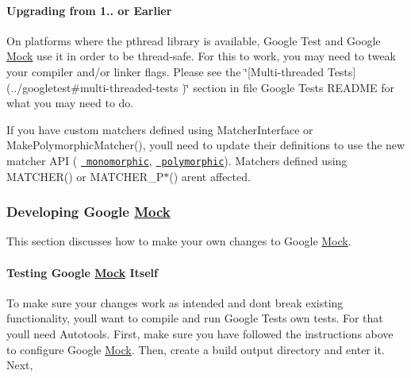 \paragraph*{Upgrading from 1.. or Earlier}

On platforms where the pthread library is available, Google Test and Google \mbox{\hyperlink{class_mock}{Mock}} use it in order to be thread-\/safe. For this to work, you may need to tweak your compiler and/or linker flags. Please see the \char`\"{}\mbox{[}\+Multi-\/threaded Tests\mbox{]}(../googletest\#multi-\/threaded-\/tests
)\char`\"{} section in file Google Test\textquotesingle{}s R\+E\+A\+D\+ME for what you may need to do.

If you have custom matchers defined using {\ttfamily Matcher\+Interface} or {\ttfamily Make\+Polymorphic\+Matcher()}, you\textquotesingle{}ll need to update their definitions to use the new matcher A\+PI ( \href{http://code.google.com/p/googlemock/wiki/CookBook#Writing_New_Monomorphic_Matchers}\texttt{ monomorphic}, \href{http://code.google.com/p/googlemock/wiki/CookBook#Writing_New_Polymorphic_Matchers}\texttt{ polymorphic}). Matchers defined using {\ttfamily M\+A\+T\+C\+H\+E\+R()} or {\ttfamily M\+A\+T\+C\+H\+E\+R\+\_\+\+P$\ast$()} aren\textquotesingle{}t affected.

\subsubsection*{Developing Google \mbox{\hyperlink{class_mock}{Mock}}}

This section discusses how to make your own changes to Google \mbox{\hyperlink{class_mock}{Mock}}.

\paragraph*{Testing Google \mbox{\hyperlink{class_mock}{Mock}} Itself}

To make sure your changes work as intended and don\textquotesingle{}t break existing functionality, you\textquotesingle{}ll want to compile and run Google Test\textquotesingle{}s own tests. For that you\textquotesingle{}ll need Autotools. First, make sure you have followed the instructions above to configure Google \mbox{\hyperlink{class_mock}{Mock}}. Then, create a build output directory and enter it. Next, 


